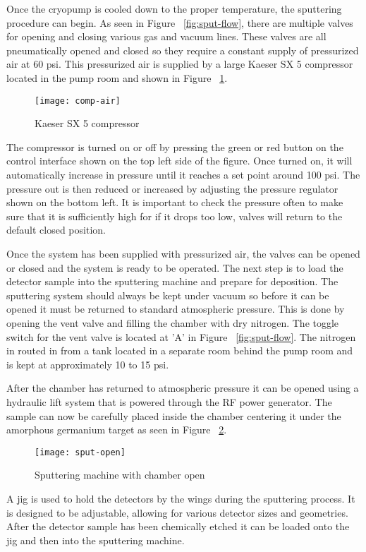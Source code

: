 Once the cryopump is cooled down to the proper temperature, the sputtering procedure can begin.
As seen in Figure ~\ref{fig:sput-flow}, there are multiple valves for opening and closing various gas and vacuum lines.
These valves are all pneumatically opened and closed so they require a constant supply of pressurized air at 60 psi.
This pressurized air is supplied by a large Kaeser SX 5 compressor located in the pump room and shown in Figure ~\ref{fig:comp-air}.
\begin{figure}[htpb]
\centering
\texttt{[image: comp-air]}
\caption{Kaeser SX 5 compressor}
\label{fig:comp-air}
\end{figure}
The compressor is turned on or off by pressing the green or red button on the control interface shown on the top left side of the figure.
Once turned on, it will automatically increase in pressure until it reaches a set point around 100 psi.
The pressure out is then reduced or increased by adjusting the pressure regulator shown on the bottom left.
It is important to check the pressure often to make sure that it is sufficiently high for if it drops too low, valves will return to the default closed position.

Once the system has been supplied with pressurized air, the valves can be opened or closed and the system is ready to be operated.
The next step is to load the detector sample into the sputtering machine and prepare for deposition.
The sputtering system should always be kept under vacuum so before it can be opened it must be returned to standard atmospheric pressure.
This is done by opening the vent valve and filling the chamber with dry nitrogen.
The toggle switch for the vent valve is located at 'A' in Figure ~\ref{fig:sput-flow}.
The nitrogen in routed in from a tank located in a separate room behind the pump room and is kept at approximately 10 to 15 psi.

After the chamber has returned to atmospheric pressure it can be opened using a hydraulic lift system that is powered through the RF power generator.
The sample can now be carefully placed inside the chamber centering it under the amorphous germanium target as seen in Figure ~\ref{fig:sput-open}.
\begin{figure}[htpb]
\centering
\texttt{[image: sput-open]}
\caption{Sputtering machine with chamber open}
\label{fig:sput-open}
\end{figure}
A jig is used to hold the detectors by the wings during the sputtering process.
It is designed to be adjustable, allowing for various detector sizes and geometries.
After the detector sample has been chemically etched it can be loaded onto the jig and then into the sputtering machine.

